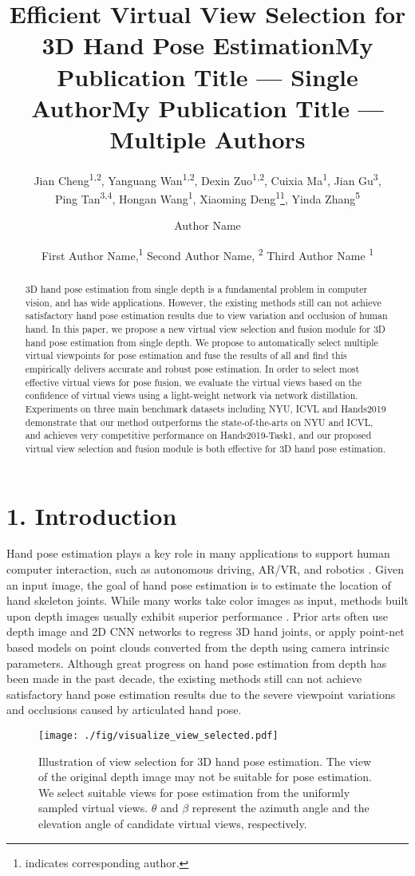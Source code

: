 \documentclass[letterpaper]{article} \usepackage{aaai22}  \usepackage{times}  \usepackage{helvet}  \usepackage{courier}  \usepackage[hyphens]{url}  \usepackage{graphicx} \urlstyle{rm} \def\UrlFont{\rm}  \usepackage{natbib}  \usepackage{caption} \DeclareCaptionStyle{ruled}{labelfont=normalfont,labelsep=colon,strut=off} \frenchspacing  \setlength{\pdfpagewidth}{8.5in}  \setlength{\pdfpageheight}{11in}  \usepackage{algorithm}
\title{Efficient Virtual View Selection for 3D Hand Pose Estimation}
\author{
    Jian Cheng\textsuperscript{\rm 1,2}\equalcontrib, 
    Yanguang Wan\textsuperscript{\rm 1,2}\equalcontrib,
    Dexin Zuo\textsuperscript{\rm 1,2},
    Cuixia Ma\textsuperscript{\rm 1},
    Jian Gu\textsuperscript{\rm 3},\\
    Ping Tan\textsuperscript{\rm 3,4},
    Hongan Wang\textsuperscript{\rm 1},
    Xiaoming Deng\textsuperscript{\rm 1}\thanks{indicates corresponding author.},
    Yinda Zhang\textsuperscript{\rm 5\dag}
}
\title{My Publication Title --- Single Author}
\author {
    Author Name
}
\title{My Publication Title --- Multiple Authors}
\author {
First Author Name,\textsuperscript{\rm 1}
    Second Author Name, \textsuperscript{\rm 2}
    Third Author Name \textsuperscript{\rm 1}
}
\begin{document}
\maketitle

\begin{abstract}
3D hand pose estimation from single depth is a fundamental problem in computer vision, and has wide applications.
However, the existing methods still can not achieve satisfactory hand pose estimation results due to view variation and occlusion of human hand. In this paper, we propose a new virtual view selection and fusion module for 3D hand pose estimation from single depth.
We propose to automatically select multiple virtual viewpoints for pose estimation and fuse the results of all and find this empirically delivers accurate and robust pose estimation.
In order to select most effective virtual views for pose fusion, we evaluate the virtual views based on the confidence of virtual views using a light-weight network via network distillation.
Experiments on three main benchmark datasets including NYU, ICVL and Hands2019 demonstrate that our method outperforms the state-of-the-arts on NYU and ICVL, and achieves very competitive performance on Hands2019-Task1, and our proposed virtual view selection and fusion module is both effective for 3D hand pose estimation. 
\end{abstract}

\section{1. Introduction}
Hand pose estimation plays a key role in many applications to support human computer interaction, such as autonomous driving, AR/VR, and robotics \cite{Erolsurvey}.
Given an input image, the goal of hand pose estimation is to estimate the location of hand skeleton joints.
While many works take color images as input, methods built upon depth images usually exhibit superior performance \cite{sun2015cascaded}. 
Prior arts often use depth image and 2D CNN networks to regress 3D hand joints, or apply point-net based models \cite{qi2017pointnet,ge2018_Point} on point clouds converted from the depth using camera intrinsic parameters.
Although great progress on hand pose estimation from depth has been made in the past decade, the existing methods still can not achieve satisfactory hand pose estimation results due to the severe viewpoint variations and occlusions caused by articulated hand pose.

\begin{figure}[h]
\centering 
\texttt{[image: ./fig/visualize\_view\_selected.pdf]}
\caption{Illustration of view selection for 3D hand pose estimation. The view of the original depth image may not be suitable for pose estimation. We select suitable views for pose estimation from the uniformly sampled virtual views. $\theta$ and $\beta$ represent the azimuth angle and the elevation angle of candidate virtual views, respectively.}
\label{fig:view_selected}
\end{figure}
\end{document}
